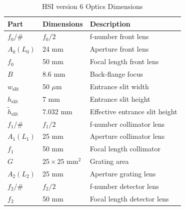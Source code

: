 \begin{table}[htbp]
	\caption{HSI version 6 Optics Dimensions}
	\label{tab:optics}
	\centering
			\begin{tabular}{p{2cm} p{2cm} l }
				\hline
				Part &	Dimensions & Description   \\
				\hline
				$f_0/\#$ & $f_0/2$ & f-number front lens \\
				$A_0 (L_0)$ & 24 mm & Aperture front lens \\
				$f_0$ & 50 mm & Focal length front lens \\
				$B$ & 8.6 mm & Back-flange focus \\
				$w_{\text{slit}}$ &	50 ${\mu}$m &  Entrance slit width \\
				$h_{\text{slit}}$ &	7 mm  & Entrance slit height \\
				$\tilde{h}_{\text{slit}}$ &	7.032 mm  & Effective entrance slit height \\
				$f_1/\#$ & $f_1/2$ & f-number collimator lens \\
				$A_1 (L_1)$ & 25 mm & Aperture collimator lens \\
				$f_1$ &	50 mm & Focal length collimator \\
				$G$ &	$25\times 25$ mm$^{2}$ & Grating area \\
				$A_2 (L_2)$ & 25 mm & Aperture grating lens \\
				$f_2/\#$ & $f_2/2$ & f-number detector lens \\
				$f_2$ &	50 mm & Focal length detector lens \\
				\hline
				\end{tabular}
\end{table}
